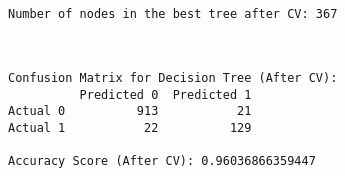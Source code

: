\documentclass[11pt]{article}
\begin{document}
    \begin{Verbatim}[commandchars=\\\{\}]

Number of nodes in the best tree after CV: 367
    \end{Verbatim}

    \begin{center}
    \end{center}
    { \hspace*{\fill} \\}
    
    \begin{Verbatim}[commandchars=\\\{\}]
Confusion Matrix for Decision Tree (After CV):
          Predicted 0  Predicted 1
Actual 0          913           21
Actual 1           22          129

Accuracy Score (After CV): 0.96036866359447
    \end{Verbatim}

    \begin{center}
    \end{center}
    { \hspace*{\fill} \\}
    
    \begin{center}
    \end{center}
    { \hspace*{\fill} \\}
    
\end{document}
